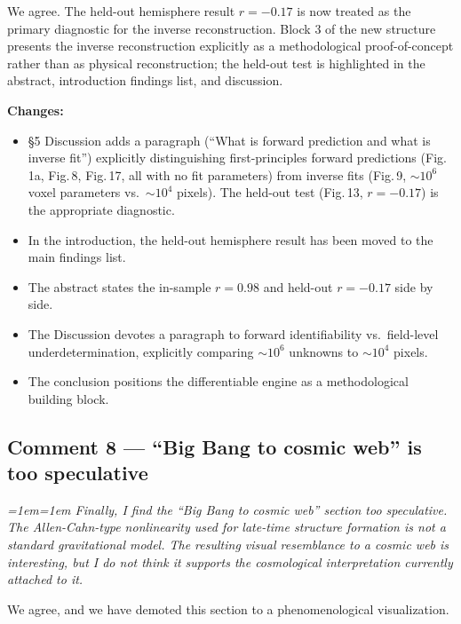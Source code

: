 \documentclass[12pt,a4paper]{article}
\newenvironment{review}{\par\color{revcolor}\itshape\leftskip=1em\rightskip=1em\noindent}{\par}
\begin{document}
We agree.
The held-out hemisphere result $r = -0.17$ is now treated as the primary diagnostic for the inverse reconstruction.
Block 3 of the new structure presents the inverse reconstruction explicitly as a methodological proof-of-concept rather than as physical reconstruction; the held-out test is highlighted in the abstract, introduction findings list, and discussion.

\textbf{Changes:}
\begin{itemize}[leftmargin=2em]
  \item §5 Discussion adds a paragraph (``What is forward prediction and what is inverse fit'') explicitly distinguishing first-principles forward predictions (Fig.\,1a, Fig.\,8, Fig.\,17, all with no fit parameters) from inverse fits (Fig.\,9, $\sim 10^6$ voxel parameters vs.\ $\sim 10^4$ pixels). The held-out test (Fig.\,13, $r = -0.17$) is the appropriate diagnostic.
  \item In the introduction, the held-out hemisphere result has been moved to the main findings list.
  \item The abstract states the in-sample $r = 0.98$ and held-out $r = -0.17$ side by side.
  \item The Discussion devotes a paragraph to forward identifiability vs.\ field-level underdetermination, explicitly comparing $\sim 10^6$ unknowns to $\sim 10^4$ pixels.
  \item The conclusion positions the differentiable engine as a methodological building block.
\end{itemize}

\subsection*{Comment 8 --- ``Big Bang to cosmic web'' is too speculative}

\begin{review}
\textit{Finally, I find the ``Big Bang to cosmic web'' section too speculative. The Allen-Cahn-type nonlinearity used for late-time structure formation is not a standard gravitational model. The resulting visual resemblance to a cosmic web is interesting, but I do not think it supports the cosmological interpretation currently attached to it.}
\end{review}

We agree, and we have demoted this section to a phenomenological visualization.
\end{document}

